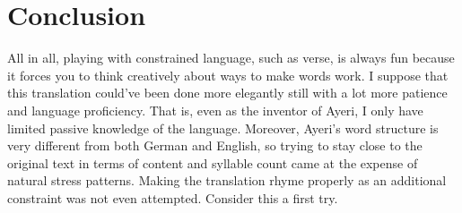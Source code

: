 \documentclass[12pt,paper=a4]{scrartcl}
\begin{document}
\section{Conclusion}

All in all, playing with constrained language, such as verse, is always fun
because it forces you to think creatively about ways to make words work. I
suppose that this translation could've been done more elegantly still with a
lot more patience and language proficiency. That is, even as the inventor of
Ayeri, I only have limited passive knowledge of the language. Moreover, Ayeri's
word structure is very different from both German and English, so trying to
stay close to the original text in terms of content and syllable count came at
the expense of natural stress patterns. Making the translation rhyme properly
as an additional constraint was not even attempted. Consider this a first try.



\begingroup\multicolsep=0pt
\printglossary[
	style=threecolumn,
	type=leipzig,
]
\endgroup

\end{document}
